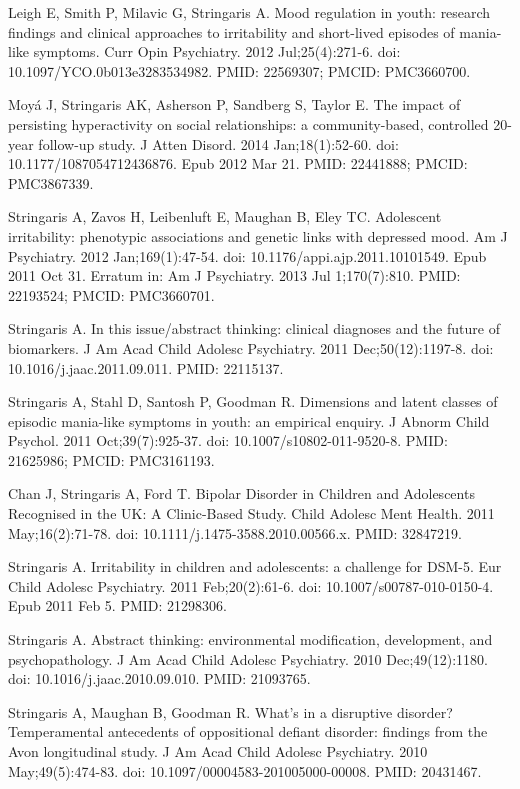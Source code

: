 \documentclass[
]{article}
\begin{document}
Leigh E, Smith P, Milavic G, Stringaris A. Mood regulation in youth:
research findings and clinical approaches to irritability and
short-lived episodes of mania-like symptoms. Curr Opin Psychiatry. 2012
Jul;25(4):271-6. doi: 10.1097/YCO.0b013e3283534982. PMID: 22569307;
PMCID: PMC3660700.

Moyá J, Stringaris AK, Asherson P, Sandberg S, Taylor E. The impact of
persisting hyperactivity on social relationships: a community-based,
controlled 20-year follow-up study. J Atten Disord. 2014
Jan;18(1):52-60. doi: 10.1177/1087054712436876. Epub 2012 Mar 21. PMID:
22441888; PMCID: PMC3867339.

Stringaris A, Zavos H, Leibenluft E, Maughan B, Eley TC. Adolescent
irritability: phenotypic associations and genetic links with depressed
mood. Am J Psychiatry. 2012 Jan;169(1):47-54. doi:
10.1176/appi.ajp.2011.10101549. Epub 2011 Oct 31. Erratum in: Am J
Psychiatry. 2013 Jul 1;170(7):810. PMID: 22193524; PMCID: PMC3660701.

Stringaris A. In this issue/abstract thinking: clinical diagnoses and
the future of biomarkers. J Am Acad Child Adolesc Psychiatry. 2011
Dec;50(12):1197-8. doi: 10.1016/j.jaac.2011.09.011. PMID: 22115137.

Stringaris A, Stahl D, Santosh P, Goodman R. Dimensions and latent
classes of episodic mania-like symptoms in youth: an empirical enquiry.
J Abnorm Child Psychol. 2011 Oct;39(7):925-37. doi:
10.1007/s10802-011-9520-8. PMID: 21625986; PMCID: PMC3161193.

Chan J, Stringaris A, Ford T. Bipolar Disorder in Children and
Adolescents Recognised in the UK: A Clinic-Based Study. Child Adolesc
Ment Health. 2011 May;16(2):71-78. doi:
10.1111/j.1475-3588.2010.00566.x. PMID: 32847219.

Stringaris A. Irritability in children and adolescents: a challenge for
DSM-5. Eur Child Adolesc Psychiatry. 2011 Feb;20(2):61-6. doi:
10.1007/s00787-010-0150-4. Epub 2011 Feb 5. PMID: 21298306.

Stringaris A. Abstract thinking: environmental modification,
development, and psychopathology. J Am Acad Child Adolesc Psychiatry.
2010 Dec;49(12):1180. doi: 10.1016/j.jaac.2010.09.010. PMID: 21093765.

Stringaris A, Maughan B, Goodman R. What's in a disruptive disorder?
Temperamental antecedents of oppositional defiant disorder: findings
from the Avon longitudinal study. J Am Acad Child Adolesc Psychiatry.
2010 May;49(5):474-83. doi: 10.1097/00004583-201005000-00008. PMID:
20431467.
\end{document}
